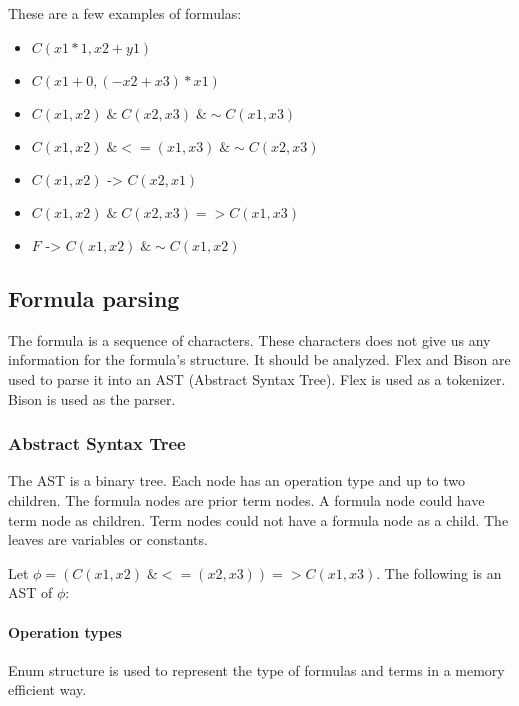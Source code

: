 \documentclass{article}
\begin{document}
	These are a few examples of formulas:
	\begin{itemize}
		\item $C(x1 * 1, x2 + y1)$
		\item $C(x1 + 0, (-x2 + x3) * x1)$
		\item $C(x1,x2) \;\&\; C(x2, x3) \;\& \sim C(x1,x3)$
		\item $C(x1,x2) \;\& <=(x1,x3) \;\& \sim C(x2,x3)$
		\item $C(x1,x2) \text{ -> } C(x2, x1)$
		\item $C(x1,x2) \;\&\; C(x2, x3) => C(x1, x3)$
		\item $F \text{ -> } C(x1,x2) \;\& \sim C(x1,x2)$
	\end{itemize}

	\subsection{Formula parsing}
	The formula is a sequence of characters. These characters does not give us any information for the formula's structure. It should be analyzed. Flex \cite{flex-tokenizer} and Bison \cite{bison-parser} are used to parse it into an AST (Abstract Syntax Tree). Flex is used as a tokenizer. Bison is used as the parser.

	\subsubsection{Abstract Syntax Tree}
	The AST is a binary tree. Each node has an operation type and up to two children. The formula nodes are prior term nodes. A formula node could have term node as children. Term nodes could not have a formula node as a child. The leaves are variables or constants.
	
	Let $\phi = (C(x1,x2) \;\& <=(x2, x3)) => C(x1, x3)$. The following is an AST of $\phi$:


	\newpage
	\paragraph{Operation types} Enum structure is used to represent the type of formulas and terms in a memory efficient way.
\end{document}
